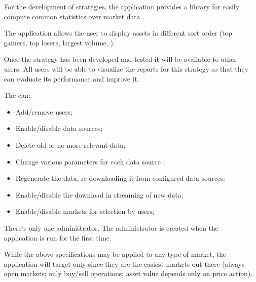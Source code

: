 For the development of strategies, the application provides a library for easily
compute common statistics over market data .

The application allows the user to display assets in different sort order (top
gainers, top losers, largest volume, \etc).

Once the strategy has been developed and tested it will be available to other
users. All users will be able to visualize the reports for this strategy so that
they can evaluate its performance and improve it.

The  can:
\begin{itemize}
	\item Add/remove users;
	\item Enable/disable data sources;
	\item Delete old or no-more-relevant data;
	\item Change various parameters for each data source ;
	\item Regenerate the data, re-downloading it from configured data
		sources;
	\item Enable/disable the download in streaming of new data;
	\item Enable/disable markets for selection by users;
\end{itemize}

There's only one administrator. The administrator is created when the
application is run for the first time.

While the above specifications may be applied to any type of market, the
application will target only  since they are
the easiest markets out there (always open markets; only buy/sell operations;
asset value depends only on price action).
